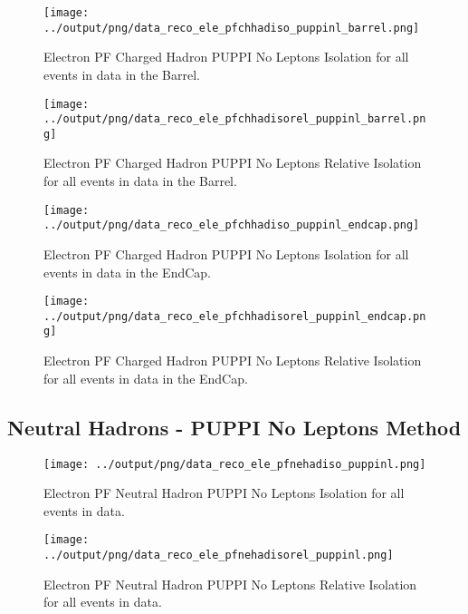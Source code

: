 \documentclass[11pt]{book}
\begin{document}
\begin{figure}[htb]
\centering
\texttt{[image: ../output/png/data\_reco\_ele\_pfchhadiso\_puppinl\_barrel.png]}
\caption{Electron PF Charged Hadron PUPPI No Leptons Isolation for all events in data in the Barrel.}
\label{fig:data_ele_pfchhadiso_puppinl_barrel}
\end{figure}

\begin{figure}[htb]
\centering
\texttt{[image: ../output/png/data\_reco\_ele\_pfchhadisorel\_puppinl\_barrel.png]}
\caption{Electron PF Charged Hadron PUPPI No Leptons Relative Isolation for all events in data in the Barrel.}
\label{fig:data_ele_pfchhadisorel_puppinl_barrel}
\end{figure}

\begin{figure}[htb]
\centering
\texttt{[image: ../output/png/data\_reco\_ele\_pfchhadiso\_puppinl\_endcap.png]}
\caption{Electron PF Charged Hadron PUPPI No Leptons Isolation for all events in data in the EndCap.}
\label{fig:data_ele_pfchhadiso_puppinl_endcap}
\end{figure}

\begin{figure}[htb]
\centering
\texttt{[image: ../output/png/data\_reco\_ele\_pfchhadisorel\_puppinl\_endcap.png]}
\caption{Electron PF Charged Hadron PUPPI No Leptons Relative Isolation for all events in data in the EndCap.}
\label{fig:data_ele_pfchhadisorel_puppinl_endcap}
\end{figure}
\clearpage

\subsection{Neutral Hadrons - PUPPI No Leptons Method}
\begin{figure}[htb]
\centering
\texttt{[image: ../output/png/data\_reco\_ele\_pfnehadiso\_puppinl.png]}
\caption{Electron PF Neutral Hadron PUPPI No Leptons Isolation for all events in data.}
\label{fig:data_ele_pfnehadiso_puppinl}
\end{figure}

\begin{figure}[htb]
\centering
\texttt{[image: ../output/png/data\_reco\_ele\_pfnehadisorel\_puppinl.png]}
\caption{Electron PF Neutral Hadron PUPPI No Leptons Relative Isolation for all events in data.}
\label{fig:data_ele_pfnehadisorel_puppinl}
\end{figure}
\end{document}
